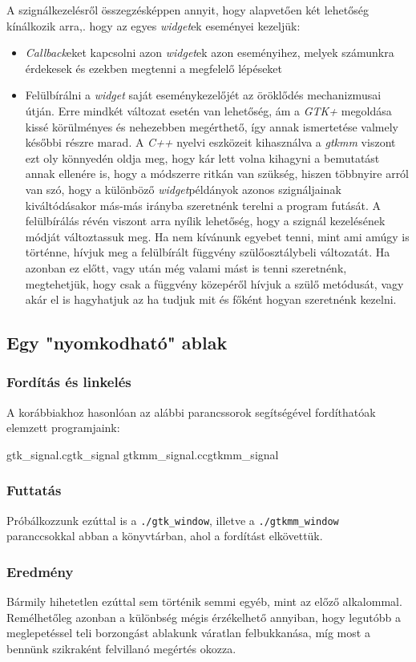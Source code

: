 A szignálkezelésről összegzésképpen annyit, hogy alapvetően két lehetőség kínálkozik arra,. hogy az egyes \textit{widget}ek eseményei kezeljük:

\begin{itemize}
 \item \textit{Callback}eket kapcsolni azon \textit{widget}ek azon eseményihez, melyek számunkra érdekesek és ezekben megtenni a megfelelő lépéseket

 \item Felülbírálni a \textit{widget} saját eseménykezelőjét az öröklődés mechanizmusai útján. Erre mindkét változat esetén van lehetőség, ám a \textit{GTK+} megoldása kissé körülményes és nehezebben megérthető, így annak ismertetése valmely későbbi részre marad. A \textit{C++} nyelvi eszközeit kihasználva a \textit{gtkmm} viszont ezt oly könnyedén oldja meg, hogy kár lett volna kihagyni a bemutatást annak ellenére is, hogy a módszerre ritkán van szükség, hiszen többnyire arról van szó, hogy a különböző \textit{widget}példányok azonos szignáljainak kiváltódásakor más-más irányba szeretnénk terelni a program futását. A felülbírálás révén viszont arra nyílik lehetőség, hogy a szignál kezelésének módját változtassuk meg. Ha nem kívánunk egyebet tenni, mint ami amúgy is történne, hívjuk meg a felülbírált függvény szülőosztálybeli változatát. Ha azonban  ez előtt, vagy után még valami mást is tenni szeretnénk, megtehetjük, hogy csak a függvény közepéről hívjuk a szülő metódusát, vagy akár el is hagyhatjuk az ha tudjuk mit és főként hogyan szeretnénk kezelni.
\end{itemize}

\subsection{Egy "nyomkodható" ablak}

\subsubsection{Fordítás és linkelés}

A korábbiakhoz hasonlóan az alábbi parancssorok segítségével fordíthatóak e\-lem\-zett programjaink:

\lstcompiles
{gtk_signal.c}{gtk_signal}
{gtkmm_signal.cc}{gtkmm_signal}

\subsubsection{Futtatás}

Próbálkozzunk ezúttal is a \texttt{./gtk\_window}, illetve a \texttt{./gtkmm\_window} paranccsokkal abban a könyvtárban, ahol a fordítást elkövettük.

\subsubsection{Eredmény}

Bármily hihetetlen ezúttal sem történik semmi egyéb, mint az előző alkalommal. Remélhetőleg azonban a különbség mégis érzékelhető annyiban, hogy legutóbb a meglepetéssel teli borzongást ablakunk váratlan felbukkanása, míg most a bennünk szikraként felvillanó megértés okozza.
